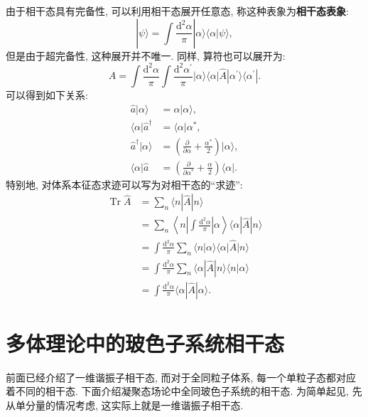 由于相干态具有完备性, 可以利用相干态展开任意态, 称这种表象为\textbf{相干态表象}:
\begin{equation}
|\psi\rangle=\int \frac{\mathrm{d}^{2} \alpha}{\pi}|\alpha\rangle\langle\alpha | \psi\rangle,
\end{equation}
但是由于超完备性, 这种展开并不唯一. 同样, 算符也可以展开为:
\begin{equation}
\hat{A}=\int \frac{\mathrm{d}^{2} \alpha}{\pi} \int \frac{\mathrm{d}^{2} \alpha^{\prime}}{\pi}|\alpha\rangle\langle\alpha|\hat{A}| \alpha^{\prime}\rangle\langle\alpha^{\prime}| .
\end{equation}
可以得到如下关系:
\begin{align}
\hat{a}|\alpha\rangle &=\alpha|\alpha\rangle, \nonumber\\
\langle\alpha| \hat{a}^{\dagger} &=\langle\alpha| \alpha^{*}, \nonumber\\
\hat{a}^{\dagger}|\alpha\rangle &=\left(\frac{\partial}{\partial \alpha}+\frac{\alpha^{*}}{2}\right)|\alpha\rangle, \nonumber\\
\langle\alpha| \hat{a} &=\left(\frac{\partial}{\partial \alpha^{*}}+\frac{\alpha}{2}\right)\langle\alpha| .
\end{align}
特别地, 对体系本征态求迹可以写为对相干态的“求迹”:
\begin{align}
\operatorname{Tr} \hat{A} &=\sum_{n}\langle n|\hat{A}| n\rangle\nonumber\\
&=\sum_{n}\left\langle n\left|\int \frac{\mathrm{d}^{2} \alpha}{\pi}\right| \alpha\right\rangle\langle\alpha|\hat{A}| n\rangle \nonumber\\
&=\int \frac{\mathrm{d}^{2} \alpha}{\pi} \sum_{n}\langle n | \alpha\rangle\langle\alpha|\hat{A}| n\rangle\nonumber\\
&=\int \frac{\mathrm{d}^{2} \alpha}{\pi} \sum_{n}\langle\alpha|\hat{A}| n\rangle\langle n |\alpha\rangle \nonumber\\
&=\int \frac{\mathrm{d}^{2} \alpha}{\pi}\langle\alpha|\hat{A}| \alpha\rangle.
\end{align}


\section{多体理论中的玻色子系统相干态}
前面已经介绍了一维谐振子相干态, 而对于全同粒子体系, 每一个单粒子态都对应着不同的相干态. 下面介绍凝聚态场论中全同玻色子系统的相干态. 为简单起见, 先从单分量的情况考虑, 这实际上就是一维谐振子相干态.

